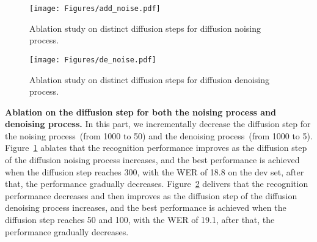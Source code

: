 \documentclass[sigconf]{acmart}
\begin{document}
\begin{figure}[h]
  \centering
  \texttt{[image: Figures/add\_noise.pdf]}
  \caption{Ablation study on distinct diffusion steps for diffusion noising process.}
 \label{Fig:noising}
\end{figure}

\begin{figure}[h]
  \centering
  \texttt{[image: Figures/de\_noise.pdf]}
  \caption{Ablation study on distinct diffusion steps for diffusion denoising process.}
 \label{Fig:denoising}
\end{figure}

\noindent \textbf{Ablation on the diffusion step for both the noising process and denoising process.}
In this part, we incrementally decrease the  diffusion step for the noising process~(from 1000 to 50) and the denoising process~(from 1000 to 5).
Figure~\ref{Fig:noising} ablates that the recognition performance improves as the diffusion step of the diffusion noising process increases, and the best performance is achieved when the diffusion step reaches 300, with the WER of 18.8 on the dev set, after that, the performance gradually decreases.
Figure~\ref{Fig:denoising} delivers that the recognition performance decreases and then improves as the diffusion step of the diffusion denoising process increases, and the best performance is achieved when the diffusion step reaches 50 and 100, with the WER of 19.1, after that, the performance gradually decreases.
\end{document}
